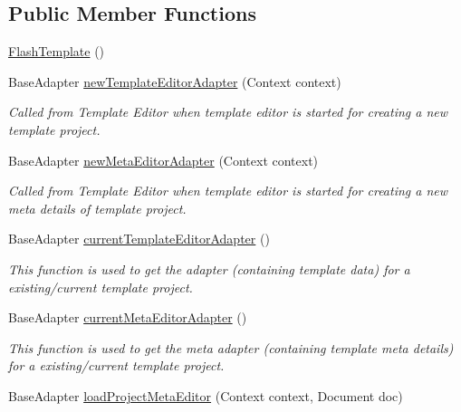 \subsection*{Public Member Functions}
\begin{DoxyCompactItemize}
\item 
\hyperlink{classorg_1_1buildmlearn_1_1toolkit_1_1templates_1_1FlashTemplate_a93eca3908cf039e1fa37e0408d0f4837}{Flash\+Template} ()
\item 
Base\+Adapter \hyperlink{classorg_1_1buildmlearn_1_1toolkit_1_1templates_1_1FlashTemplate_ad524e69199d8435959cf348558039b2d}{new\+Template\+Editor\+Adapter} (Context context)
\begin{DoxyCompactList}\small\item\em Called from Template Editor when template editor is started for creating a new template project. \end{DoxyCompactList}\item 
Base\+Adapter \hyperlink{classorg_1_1buildmlearn_1_1toolkit_1_1templates_1_1FlashTemplate_acc09bbe7a90180bee49dfe4092f8cb29}{new\+Meta\+Editor\+Adapter} (Context context)
\begin{DoxyCompactList}\small\item\em Called from Template Editor when template editor is started for creating a new meta details of template project. \end{DoxyCompactList}\item 
Base\+Adapter \hyperlink{classorg_1_1buildmlearn_1_1toolkit_1_1templates_1_1FlashTemplate_a70db96b6e7ec5e339fe106fc15d64860}{current\+Template\+Editor\+Adapter} ()
\begin{DoxyCompactList}\small\item\em This function is used to get the adapter (containing template data) for a existing/current template project. \end{DoxyCompactList}\item 
Base\+Adapter \hyperlink{classorg_1_1buildmlearn_1_1toolkit_1_1templates_1_1FlashTemplate_af0e590dfdd08ff97be8c27c16a851d1d}{current\+Meta\+Editor\+Adapter} ()
\begin{DoxyCompactList}\small\item\em This function is used to get the meta adapter (containing template meta details) for a existing/current template project. \end{DoxyCompactList}\item 
Base\+Adapter \hyperlink{classorg_1_1buildmlearn_1_1toolkit_1_1templates_1_1FlashTemplate_af8aef752122b92b1f65cb9441af82653}{load\+Project\+Meta\+Editor} (Context context, Document doc)

\end{DoxyCompactItemize}

